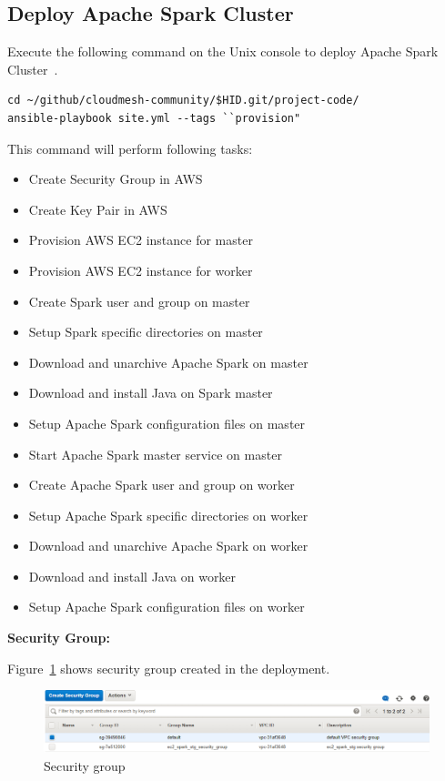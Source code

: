 \subsection{Deploy Apache Spark Cluster}

Execute the following command on the Unix console to deploy Apache
Spark Cluster~\cite{hid-sp18-511-www-spark}.

\begin{verbatim}
cd ~/github/cloudmesh-community/$HID.git/project-code/
ansible-playbook site.yml --tags ``provision"
\end{verbatim}

This command will perform following tasks:

\begin{itemize}
	\item Create Security Group in AWS
	\item Create Key Pair in AWS
	\item Provision AWS EC2 instance for master
	\item Provision AWS EC2 instance for worker
	\item Create Spark user and group on master
	\item Setup Spark specific directories on master
	\item Download and unarchive Apache Spark on master
	\item Download and install Java on Spark master
	\item Setup Apache Spark configuration files on master
	\item Start Apache Spark master service on master
	\item Create Apache Spark user and group on worker
	\item Setup Apache Spark specific directories on worker
	\item Download and unarchive Apache Spark on worker
	\item Download and install Java  on worker
	\item Setup Apache Spark configuration files on worker
\end{itemize}

\textbf{Security Group:}

Figure~\ref{f:security-group} shows security group created in the deployment.

\begin{figure}[!ht]
	\centering\includegraphics[width=\columnwidth]{images/securitygroup.png}
	\caption{Security group}\label{f:security-group}
\end{figure}

